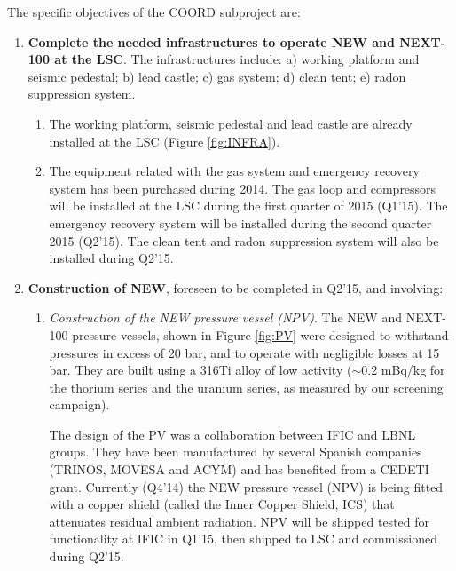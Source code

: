 
The specific objectives of the COORD subproject are:

\begin{enumerate}
\item {\bf Complete the needed infrastructures to operate NEW and NEXT-100 at the LSC}. 
The infrastructures include: a) working platform and seismic pedestal; b) lead castle; c) gas system; d) clean tent; e) radon suppression system. 
\begin{enumerate}
\item The working platform, seismic pedestal and lead castle are already installed at the LSC (Figure \ref{fig:INFRA}).
\item The equipment related with the gas system and emergency recovery system has been purchased during 2014. The gas loop and compressors will be installed at the LSC during the first quarter of 2015 (Q1'15). The emergency recovery system will be installed during the second quarter 2015 (Q2'15). The clean tent and radon suppression system will also be installed during Q2'15. 
\end{enumerate}

\item {\bf Construction of NEW}, foreseen to be completed in Q2'15, and involving:
\begin{enumerate}
\item {\em Construction of the NEW pressure vessel (NPV)}.
The NEW and NEXT-100 pressure vessels, shown in Figure \ref{fig:PV} were designed to withstand pressures in excess of 20 bar, and to operate with negligible losses at 15 bar. They are built using a 316Ti alloy of low activity ($\sim$0.2 mBq/kg for the thorium series and the uranium series, as measured by our screening campaign). 

The design of the PV was a collaboration between IFIC and LBNL groups. They have been manufactured by several Spanish companies (TRINOS, MOVESA and ACYM) and has benefited from a CEDETI grant. Currently (Q4'14) the NEW pressure vessel (NPV) is being fitted with a copper shield (called the Inner Copper Shield, ICS) that attenuates residual ambient radiation. NPV will be shipped tested for functionality at IFIC in Q1'15, then shipped to LSC and commissioned during Q2'15. 


\end{enumerate}
\end{enumerate}
